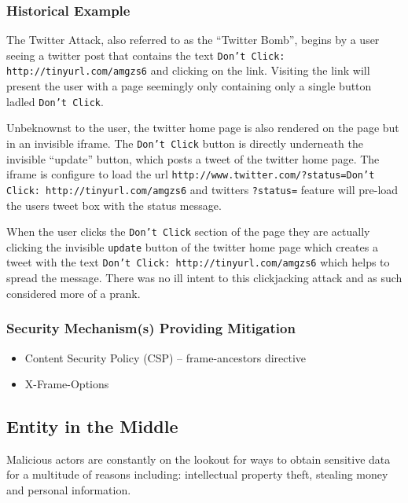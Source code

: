 \documentclass{mscreport}
\begin{document}
\subsubsection{Historical Example}
The Twitter Attack, also referred to as the ``Twitter Bomb'', begins by a user seeing a twitter post that contains the text \texttt{Don't Click: http://tinyurl.com/amgzs6} \cite{Jani2015-kw} and clicking on the link. Visiting the link will present the user with a page seemingly only containing only a single button ladled \texttt{Don't Click}.

\vspace{0.3cm} \noindent
Unbeknownst to the user, the twitter home page is also rendered on the page but in an invisible iframe. The \texttt{Don't Click} button is directly underneath the invisible ``update'' button, which posts a tweet of the twitter home page. The iframe is configure to load the url \texttt{http://www.twitter.com/?status=Don't Click: http://tinyurl.com/amgzs6} \cite{Jani2015-kw} and twitters \texttt{?status=} feature will pre-load the users tweet box with the status message.

\vspace{0.3cm} \noindent
When the user clicks the \texttt{Don't Click} section of the page they are actually clicking the invisible \texttt{update} button of the twitter home page which creates a tweet with the text \texttt{Don’t Click: http://tinyurl.com/amgzs6} \cite{Jani2015-kw} which helps to spread the message. There was no ill intent to this clickjacking attack and as such considered more of a prank.
\subsubsection{Security Mechanism(s) Providing Mitigation}

\begin{itemize}
	\setlength\itemsep{0.1em}
	\item Content Security Policy (CSP) – frame-ancestors directive
	\item X-Frame-Options
\end{itemize}

\subsection{Entity in the Middle}
\label{subsection:entity_in_the_middle}

Malicious actors are constantly on the lookout for ways to obtain sensitive data for a multitude of reasons including: intellectual property theft, stealing money and personal information.
\end{document}
